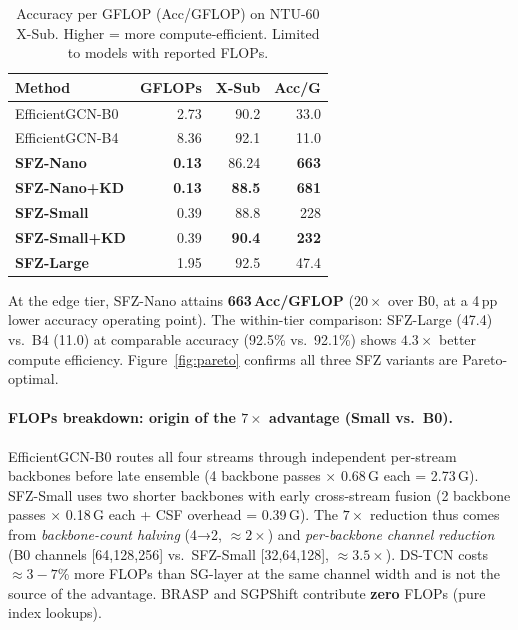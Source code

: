 \documentclass[sigconf,screen,review,anonymous]{acmart}
\newcommand{\best}[1]{{\color{bestcol}\textbf{#1}}}
\begin{document}
\begin{table}[t]
\centering
\caption{Accuracy per GFLOP (Acc/GFLOP) on NTU-60 X-Sub.
  Higher = more compute-efficient. Limited to models with reported FLOPs.}
\label{tab:accm}
\setlength{\tabcolsep}{4pt}
\begin{tabular}{lrrr}
\toprule
Method & GFLOPs & X-Sub & Acc/G \\
\midrule
EfficientGCN-B0~\cite{efficientgcn} & 2.73 & 90.2 & 33.0 \\
EfficientGCN-B4~\cite{efficientgcn} & 8.36 & 92.1 & 11.0 \\
\midrule
\textbf{SFZ-Nano}      & \best{0.13} & 86.24 & \best{663} \\
\textbf{SFZ-Nano+KD}  & \best{0.13} & \best{88.5} & \best{681} \\
\textbf{SFZ-Small}    & 0.39 & 88.8 & 228 \\
\textbf{SFZ-Small+KD} & 0.39 & \best{90.4} & \best{232} \\
\textbf{SFZ-Large}    & 1.95 & 92.5 & 47.4 \\
\bottomrule
\end{tabular}
\vspace{-3mm}\end{table}

At the edge tier, SFZ-Nano attains \textbf{663\,Acc/GFLOP} ($20{\times}$ over B0,
at a 4\,pp lower accuracy operating point).
The within-tier comparison: SFZ-Large (47.4) vs.\ B4 (11.0) at comparable
accuracy (92.5\% vs.\ 92.1\%) shows $4.3{\times}$ better compute efficiency.
Figure~\ref{fig:pareto} confirms all three SFZ variants are Pareto-optimal.

\paragraph{FLOPs breakdown: origin of the $7{\times}$ advantage (Small vs.\ B0).}
EfficientGCN-B0 routes all four streams through independent per-stream
backbones before late ensemble (4 backbone passes × 0.68\,G each = 2.73\,G).
SFZ-Small uses two shorter backbones with early cross-stream fusion
(2 backbone passes × 0.18\,G each + CSF overhead = 0.39\,G).
The $7{\times}$ reduction thus comes from \emph{backbone-count halving} (4→2,
${\approx}2{\times}$) and \emph{per-backbone channel reduction} (B0 channels
[64,128,256] vs.\ SFZ-Small [32,64,128], ${\approx}3.5{\times}$).
DS-TCN costs ${\approx}3{-}7$\% more FLOPs than SG-layer at the same
channel width and is not the source of the advantage.
BRASP and SGPShift contribute \textbf{zero} FLOPs (pure index lookups).
\end{document}
